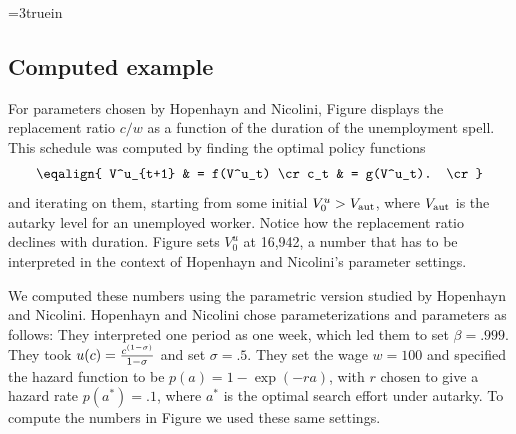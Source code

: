 

\centerline{\epsfxsize=3truein}
\caption{Top panel:  replacement ratio $c/w$ as a function of duration of
unemployment in the Shavell-Weiss model. Bottom panel: effort $a$ as a function of duration.}
\endfigure

   
\subsection{Computed example}
For parameters chosen by Hopenhayn and Nicolini, Figure  %
displays the
replacement ratio $c / w$ as a function of  the duration of the unemployment
spell.
 This schedule was computed by finding the optimal policy functions
$$ \eqalign{ V^u_{t+1} & = f(V^u_t) \cr
             c_t & = g(V^u_t). \cr} $$
and iterating on them, starting from some initial $V^u_0 > V_{\rm aut}$,
where $V_{\rm aut}$ is the autarky level for an unemployed worker.
Notice how the replacement ratio declines with duration.
Figure  %
sets $V^u_0$ at 16,942, a number that
has to be interpreted in the context of Hopenhayn and Nicolini's
parameter settings.

We computed these numbers using the parametric version studied by Hopenhayn
and Nicolini.
  Hopenhayn and Nicolini chose parameterizations and parameters as follows:
They interpreted one  period as one week, which led them
to set $\beta=.999$.  They took  $u(c) = {c^{(1-\sigma)} \over 1 - \sigma}$
and set
$\sigma=.5$.  They set the wage $w=100$ and
specified the hazard function to be  $p(a) = 1 - \exp(-ra)$, with $r$ chosen
to give a hazard rate $ p(a^*) = .1$, where
$a^*$ is the optimal search  effort under autarky. To compute the numbers
in Figure  we used
these same settings.

